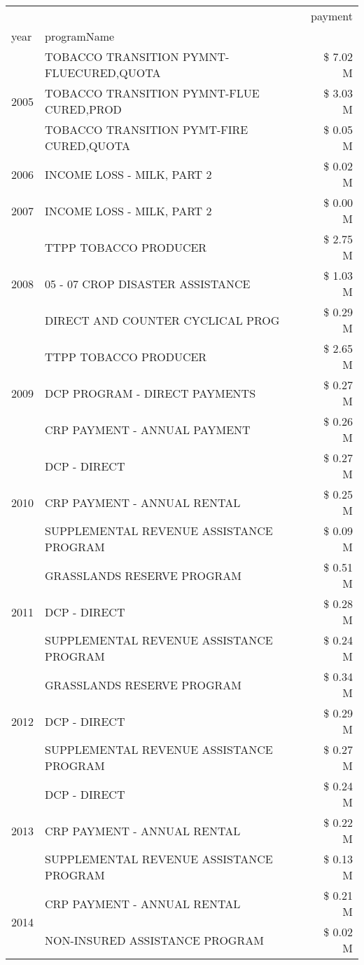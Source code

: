 \begin{tabular}{llr}
\toprule
 &  & payment \\
year & programName &  \\
\midrule
\multirow[t]{3}{*}{2005} & TOBACCO TRANSITION PYMNT-FLUECURED,QUOTA & \$ 7.02 M \\
 & TOBACCO TRANSITION PYMNT-FLUE CURED,PROD & \$ 3.03 M \\
 & TOBACCO TRANSITION PYMT-FIRE CURED,QUOTA & \$ 0.05 M \\
\cline{1-3}
2006 & INCOME LOSS - MILK, PART 2 & \$ 0.02 M \\
\cline{1-3}
2007 & INCOME LOSS - MILK, PART 2 & \$ 0.00 M \\
\cline{1-3}
\multirow[t]{3}{*}{2008} & TTPP TOBACCO PRODUCER & \$ 2.75 M \\
 & 05 - 07 CROP DISASTER ASSISTANCE & \$ 1.03 M \\
 & DIRECT AND COUNTER CYCLICAL PROG & \$ 0.29 M \\
\cline{1-3}
\multirow[t]{3}{*}{2009} & TTPP TOBACCO PRODUCER & \$ 2.65 M \\
 & DCP PROGRAM - DIRECT PAYMENTS & \$ 0.27 M \\
 & CRP PAYMENT - ANNUAL PAYMENT & \$ 0.26 M \\
\cline{1-3}
\multirow[t]{3}{*}{2010} & DCP - DIRECT & \$ 0.27 M \\
 & CRP PAYMENT - ANNUAL RENTAL & \$ 0.25 M \\
 & SUPPLEMENTAL REVENUE ASSISTANCE PROGRAM & \$ 0.09 M \\
\cline{1-3}
\multirow[t]{3}{*}{2011} & GRASSLANDS RESERVE PROGRAM & \$ 0.51 M \\
 & DCP - DIRECT & \$ 0.28 M \\
 & SUPPLEMENTAL REVENUE ASSISTANCE PROGRAM & \$ 0.24 M \\
\cline{1-3}
\multirow[t]{3}{*}{2012} & GRASSLANDS RESERVE PROGRAM & \$ 0.34 M \\
 & DCP - DIRECT & \$ 0.29 M \\
 & SUPPLEMENTAL REVENUE ASSISTANCE PROGRAM & \$ 0.27 M \\
\cline{1-3}
\multirow[t]{3}{*}{2013} & DCP - DIRECT & \$ 0.24 M \\
 & CRP PAYMENT - ANNUAL RENTAL & \$ 0.22 M \\
 & SUPPLEMENTAL REVENUE ASSISTANCE PROGRAM & \$ 0.13 M \\
\cline{1-3}
\multirow[t]{3}{*}{2014} & CRP PAYMENT - ANNUAL RENTAL & \$ 0.21 M \\
 & NON-INSURED ASSISTANCE PROGRAM & \$ 0.02 M \\

\end{tabular}
